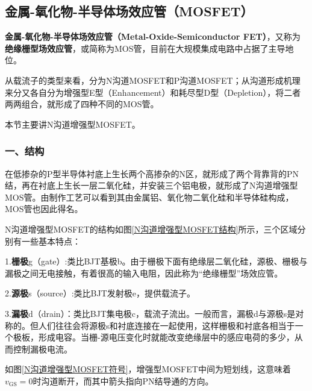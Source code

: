 \subsection{金属-氧化物-半导体场效应管（MOSFET）}
\textbf{金属-氧化物-半导体场效应管（Metal-Oxide-Semiconductor FET）}，又称为\textbf{绝缘栅型场效应管}，或简称为MOS管，目前在大规模集成电路中占据了主导地位。

从载流子的类型来看，分为N沟道MOSFET和P沟道MOSFET；从沟道形成机理来分又各自分为增强型E型（Enhancement）和耗尽型D型（Depletion），将二者两两组合，就形成了四种不同的MOS管。

本节主要讲N沟道增强型MOSFET。

\subsubsection{一、结构}
在低掺杂的P型半导体衬底上生长两个高掺杂的N区，就形成了两个背靠背的PN结，再在衬底上生长一层二氧化硅，并安装三个铝电极，就形成了N沟道增强型MOS管。由制作工艺可以看到其由金属铝、氧化物二氧化硅和半导体硅构成，MOS管也因此得名。

N沟道增强型MOSFET的结构如图\ref{N沟道增强型MOSFET结构}所示，三个区域分别有一些基本特点：

1.\textbf{栅极}g（gate）:类比BJT基极b。由于栅极下面有绝缘层二氧化硅，源极、栅极与漏极之间无电接触，有着很高的输入电阻，因此称为“绝缘栅型”场效应管。

2.\textbf{源极}s（source）:类比BJT发射极e，提供载流子。

3.\textbf{漏极}d（drain）：类比BJT集电极c，载流子流出。一般而言，漏极d与源极s是对称的。但人们往往会将源极s和衬底连接在一起使用，这样栅极和衬底各相当于一个极板，形成电容。当栅-源电压变化时就能改变绝缘层中的感应电荷的多少，从而控制漏极电流。

如图\ref{N沟道增强型MOSFET符号}，增强型MOSFET中间为短划线，这意味着$v_{\mathrm{GS}}=0$时沟道断开，而其中箭头指向PN结导通的方向。

